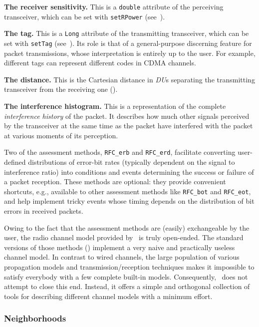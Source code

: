 \noindent
{\bf The receiver sensitivity.}
This is a {\tt double} attribute of the perceiving transceiver, which can be
set with {\tt setRPower} (see~).

\noindent
{\bf The tag.}
This is a {\tt Long} attribute of the transmitting transceiver, which can be
set with {\tt setTag} (see~).
Its role is that of a general-purpose discerning feature for packet
transmissions, whose interpretation is entirely up to the user.
For example, different tags can represent different codes in CDMA channels.

\noindent
{\bf The distance.}
This is the Cartesian distance in {\em DU\/}s
separating the transmitting transceiver from
the receiving one ().

\noindent
{\bf The interference histogram.}
This is a representation of the complete {\em interference history\/} of
the packet.
It describes how much other signals perceived by the transceiver at the
same time as the packet have interfered with the packet at various moments of
its perception.

Two of the assessment methods, {\tt RFC\_erb} and {\tt RFC\_erd}, facilitate
converting user-defined distributions of error-bit rates (typically dependent
on the signal to interference ratio) into conditions and events determining
the success or failure of a packet reception.
These methods are optional: they provide convenient shortcuts, e.g., available
to other assessment methods like {\tt RFC\_bot} and {\tt RFC\_eot},
and help implement
tricky events whose timing depends on the distribution of bit errors in
received packets.

Owing to the fact that the assessment methods are (easily) exchangeable by the
user, the radio channel model provided by \smurph\ is truly open-ended.
The standard versions of those methods ()
implement a very naive and practically useless channel model.
In contrast to wired channels, the large population of various propagation
models and transmission/reception techniques
makes it impossible to satisfy everybody with a few complete built-in models.
Consequently, \smurph\ does not attempt to close this end.
Instead, it offers a simple and orthogonal collection of tools for
describing different channel models with a minimum effort.

\subsubsection{Neighborhoods}
\label{rm_tr_ra_ne}

